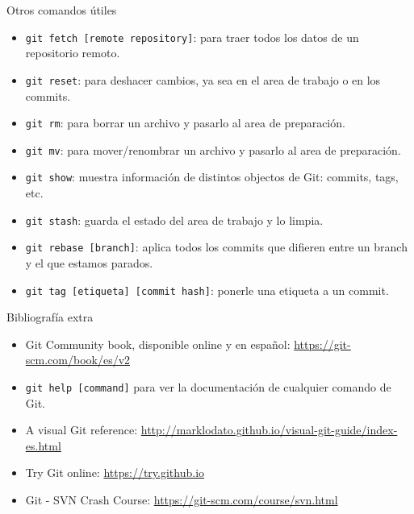 \documentclass{beamer}
\begin{document}
\begin{frame}{Otros comandos útiles}

    \begin{itemize}
        \item \texttt{git fetch [remote repository]}: para traer todos los datos de un repositorio remoto.
        \item \texttt{git reset}: para deshacer cambios, ya sea en el area de trabajo o en los commits.
        \item \texttt{git rm}: para borrar un archivo y pasarlo al area de preparación.
        \item \texttt{git mv}: para mover/renombrar un archivo y pasarlo al area de preparación.
        \item \texttt{git show}: muestra información de distintos objectos de Git: commits, tags, etc.
        \item \texttt{git stash}: guarda el estado del area de trabajo y lo limpia.
        \item \texttt{git rebase [branch]}: aplica todos los commits que difieren entre un branch y el que estamos parados.
        \item \texttt{git tag [etiqueta] [commit hash]}: ponerle una etiqueta a un commit.
    \end{itemize}

\end{frame}

\begin{frame}{Bibliografía extra}

    \begin{itemize}
        \item Git Community book, disponible online y en español: \url{https://git-scm.com/book/es/v2}
		\item \texttt{git help [command]} para ver la documentación de cualquier comando de Git.
		\item A visual Git reference: \url{http://marklodato.github.io/visual-git-guide/index-es.html}
		\item Try Git online: \url{https://try.github.io}
        \item Git - SVN Crash Course: \url{https://git-scm.com/course/svn.html}
    \end{itemize}

\end{frame}
\end{document}
